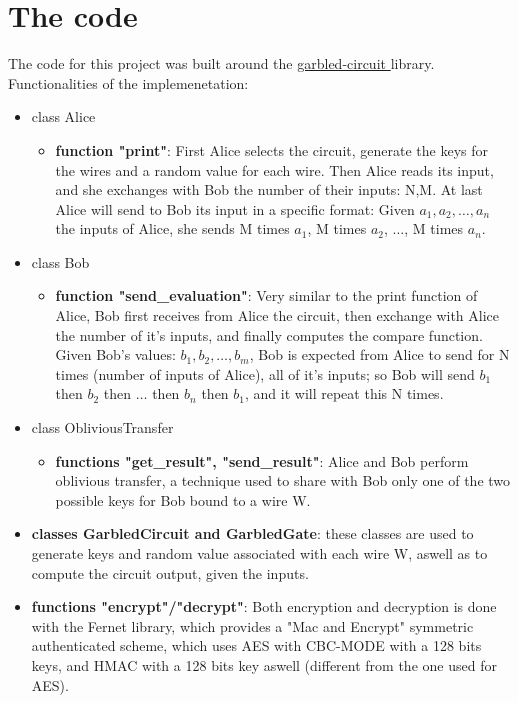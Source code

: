 \documentclass[12pt, letterpaper]{article}
\begin{document}
\section{The code}
\label{sec:code}
The code for this project was built around the \href{https://github.com/ojroques/garbled-circuit}{garbled-circuit } library.
\\
Functionalities of the implemenetation:
\begin{itemize}
    \item class Alice
        \begin{itemize}
            \item \textbf{function "print"}: First Alice selects the circuit, generate the keys for the wires and a random value for each wire. Then Alice reads its input, and she exchanges with Bob the number of their inputs: N,M. At last Alice will send to Bob its input in a specific format: Given $a_1, a_2, \dots, a_n$ the inputs of Alice, she sends M times $a_1$, M times $a_2$, $\dots$, M times $a_n$.
        \end{itemize} 
    \item class Bob
        \begin{itemize}
            \item \textbf{function "send\_evaluation"}: Very similar to the print function of Alice, Bob first receives from Alice the circuit, then exchange with Alice the number of it's inputs, and finally computes the compare function. Given Bob's values: $b_1, b_2, \dots, b_m$, Bob is expected from Alice to send for N times (number of inputs of Alice), all of it's inputs; so Bob will send $b_1$ then $b_2$ then $\dots$ then $b_n$ then $b_1$, and it will repeat this N times.
        \end{itemize}
    \item class ObliviousTransfer
    \begin{itemize}
        \item \textbf{functions "get\_result", "send\_result"}: Alice and Bob perform oblivious transfer, a technique used to share with Bob only one of the two possible keys for Bob bound to a wire W.
    \end{itemize}
    \item \textbf{classes GarbledCircuit and GarbledGate}: these classes are used to generate keys and random value associated with each wire W, aswell as to compute the circuit output, given the inputs.
    \item \textbf{functions "encrypt"/"decrypt"}: Both encryption and decryption is done with the Fernet library, which provides a "Mac and Encrypt" symmetric authenticated scheme, which uses AES with CBC-MODE with a 128 bits keys, and HMAC with a 128 bits key aswell (different from the one used for AES).

\end{itemize}
\end{document}
